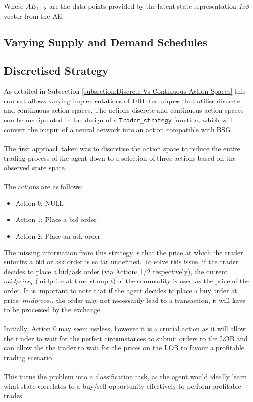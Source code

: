 \documentclass[ %
                    author={Ashwinder Khurana},
                supervisor={Prof Dave Cliff},
                    degree={MEng},
                     title={The Deeply Reinforced Trader},
                  subtitle={},
                      type={enterprise},
                      year={2020} ]{dissertation}
\begin{document}
{\noindent
Where $AE_{1-8}$ are the data points provided by the latent state representation \textit{1x8} vector from the AE. 

%
\subsection{Varying Supply and Demand Schedules}
\subsection{Discretised Strategy}
\label{subsection:Discretised Strategy}
As detailed in Subsection \ref{subsection:Discrete Vs Continuous Action Spaces} this context allows varying implementations of DRL techniques that utilise discrete and continuous action spaces. The actions discrete and continuous action spaces can be manipulated in the design of a \texttt{Trader\_strategy} function, which will convert the output of a neural network into an action compatible with BSG. 
\\
\\
The first approach taken was to discretise the action space to reduce the entire trading process of the agent down to a selection of three actions based on the observed state space.
\\
\\
The actions are as follows: 
\begin{itemize}
\item Action 0: NULL 
\item Action 1: Place a bid order
\item Action 2: Place an ask order
\end{itemize}

\noindent
The missing information from this strategy is that the price at which the trader submits a bid or ask order is so far undefined. To solve this issue, if the trader decides to place a bid/ask order (via Actions 1/2 respectively), the current $midprice_t$ (midprice at time stamp $t$) of the commodity is used as the price of the order. It is important to note that if the agent decides to place a buy order at price: $midprice_t$, the order may not necessarily lead to a transaction, it will have to be processed by the exchange. 
\\
\\
Initially, Action 0 may seem useless, however it is a crucial action as it will allow the trader to wait for the perfect circumstances to submit orders to the LOB and can allow the the trader to wait for the prices on the LOB to favour a profitable trading scenario.
\\
\\
This turns the problem into a classification task, as the agent would ideally learn what state correlates to a buy/sell opportunity effectively to perform profitable trades. 

}
\end{document}
